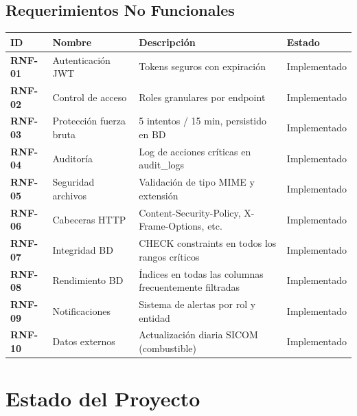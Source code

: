 \documentclass[12pt,a4paper]{article}
\begin{document}
\subsection{Requerimientos No Funcionales}

\begin{longtable}{>{\bfseries}p{2.2cm} p{4cm} p{6.5cm} p{1.5cm}}
  \toprule
  \textbf{ID} & \textbf{Nombre} & \textbf{Descripción} & \textbf{Estado} \\
  \midrule

  RNF-01 & Autenticación JWT & Tokens seguros con expiración & \textcolor{green!50!black}{Implementado} \\[3pt]
  RNF-02 & Control de acceso & Roles granulares por endpoint & \textcolor{green!50!black}{Implementado} \\[3pt]
  RNF-03 & Protección fuerza bruta & 5 intentos / 15 min, persistido en BD & \textcolor{green!50!black}{Implementado} \\[3pt]
  RNF-04 & Auditoría & Log de acciones críticas en audit\_logs & \textcolor{green!50!black}{Implementado} \\[3pt]
  RNF-05 & Seguridad archivos & Validación de tipo MIME y extensión & \textcolor{green!50!black}{Implementado} \\[3pt]
  RNF-06 & Cabeceras HTTP & Content-Security-Policy, X-Frame-Options, etc. & \textcolor{green!50!black}{Implementado} \\[3pt]
  RNF-07 & Integridad BD & CHECK constraints en todos los rangos críticos & \textcolor{green!50!black}{Implementado} \\[3pt]
  RNF-08 & Rendimiento BD & Índices en todas las columnas frecuentemente filtradas & \textcolor{green!50!black}{Implementado} \\[3pt]
  RNF-09 & Notificaciones & Sistema de alertas por rol y entidad & \textcolor{green!50!black}{Implementado} \\[3pt]
  RNF-10 & Datos externos & Actualización diaria SICOM (combustible) & \textcolor{green!50!black}{Implementado} \\

  \bottomrule
\end{longtable}

\newpage
\section{Estado del Proyecto}
\end{document}
